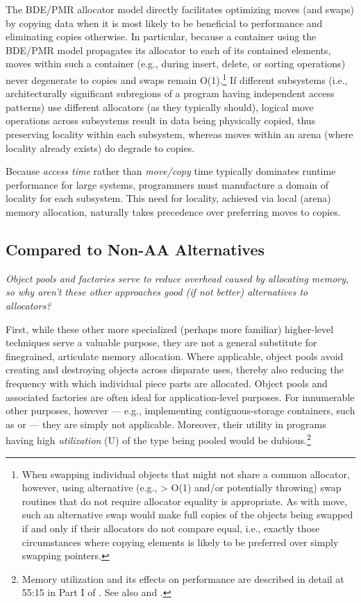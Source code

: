 The BDE/PMR allocator model directly facilitates optimizing moves (and swaps) by
copying data when it is most likely to be beneficial to performance and eliminating
copies otherwise. In particular, because a container using the BDE/PMR model
propagates its allocator to each of its contained elements, moves within such a
container (e.g., during insert, delete, or sorting operations) never degenerate to
copies and swaps remain O(1).\footnote{When swapping individual objects that might not share a common allocator, however, using
alternative (e.g., > O(1) and/or potentially throwing) swap routines that do not require allocator
equality is appropriate. As with move, such an alternative swap would make full copies of the objects
being swapped if and only if their allocators do not compare equal, i.e., exactly those circumstances
where copying elements is likely to be preferred over simply swapping pointers.}
If different subsystems (i.e., architecturally
significant subregions of a program having independent access patterns) use
different allocators (as they typically should), logical move operations across
subsystems result in data being physically copied, thus preserving locality within
each subsystem, whereas moves within an arena (where locality already exists) do
degrade to copies.

Because \emph{access time} rather than \emph{move/copy} time typically dominates runtime
performance for large systems, programmers must manufacture a domain of locality
for each subsystem. This need for locality, achieved via local (arena) memory
allocation, naturally takes precedence over preferring moves to copies.

\subsection{Compared to Non-AA Alternatives}
\emph{Object pools and factories serve to reduce overhead caused by allocating memory, so
  why aren’t these other approaches good (if not better) alternatives to allocators?}

First, while these other more specialized (perhaps more familiar) higher-level
techniques serve a valuable purpose, they are not a general substitute for finegrained, articulate memory allocation. Where applicable, object pools avoid creating
and destroying objects across disparate uses, thereby also reducing the frequency
with which individual piece parts are allocated. Object pools and associated factories
are often ideal for application-level purposes. For innumerable other purposes,
however — e.g., implementing contiguous-storage containers, such as 
or  — they are simply not applicable. Moreover, their utility in programs
having high \emph{utilization} (U) of the type being pooled would be dubious.\footnote{Memory utilization and its effects on performance are described in detail at 55:15 in Part I of
\cite{lakos17b}. See also \cite{lakos16} and \cite{bleaney16}.}


